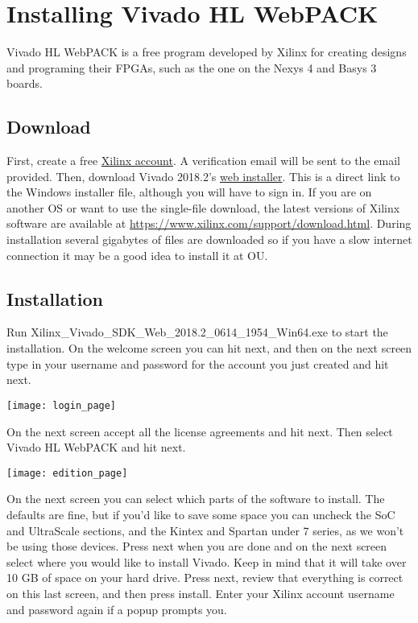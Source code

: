 \section{Installing Vivado HL WebPACK}
Vivado HL WebPACK is a free program developed by Xilinx for creating designs and programing their
FPGAs, such as the one on the Nexys 4 and Basys 3 boards.

\subsection{Download}
First, create a free \href{https://www.xilinx.com/registration/create-account.html}
{Xilinx account}.
A verification email will be sent to the email provided.
Then, download Vivado 2018.2's
\href{https://www.xilinx.com/member/forms/download/xef.html?filename=Xilinx_Vivado_SDK_Web_2018.2_0614_1954_Win64.exe}
{web installer}.
This is a direct link to the Windows installer file, although you will have to sign in.
If you are on another OS or want to use the single-file download, the latest versions of Xilinx
software are available at \url{https://www.xilinx.com/support/download.html}.
During installation several gigabytes of files are downloaded so if you have a slow internet
connection it may be a good idea to install it at OU.

\subsection{Installation}
Run Xilinx\_Vivado\_SDK\_Web\_2018.2\_0614\_1954\_Win64.exe to start the installation.
On the welcome screen you can hit next, and then on the next screen type in your username and
password for the account you just created and hit next.

\begin{center}
    \texttt{[image: login\_page]}
\end{center}

On the next screen accept all the license agreements and hit next.
Then select Vivado HL WebPACK and hit next.

\begin{center}
    \texttt{[image: edition\_page]}
\end{center}

On the next screen you can select which parts of the software to install.
The defaults are fine, but if you’d like to save some space you can uncheck the SoC and UltraScale
sections, and the Kintex and Spartan under 7 series, as we won’t be using those devices.
Press next when you are done and on the next screen select where you would like to install Vivado.
Keep in mind that it will take over 10 GB of space on your hard drive.
Press next, review that everything is correct on this last screen, and then press install.
Enter your Xilinx account username and password again if a popup prompts you.

